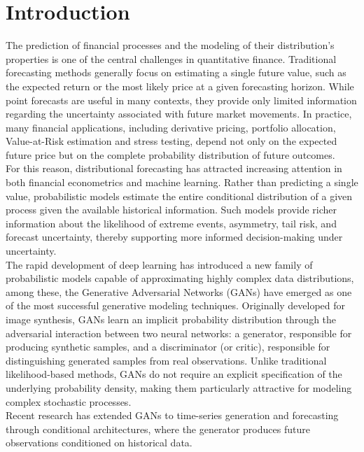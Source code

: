 \chapter{Introduction}


The prediction of financial processes and the modeling of their 
distribution's properties is
one of the central challenges in quantitative finance.
Traditional forecasting methods generally focus on estimating a single future value,
such as the expected return or the most likely price at a given forecasting horizon.
While point forecasts are useful in many contexts,
they provide only limited information regarding the uncertainty
associated with future market movements.
In practice, many financial applications, including derivative pricing, portfolio allocation, Value-at-Risk estimation and stress testing,
depend not only on the expected future price but on the complete probability distribution of future outcomes.\\

For this reason, distributional forecasting has attracted increasing attention in both financial econometrics and machine learning.
Rather than predicting a single value, 
probabilistic models estimate the entire conditional distribution of a given process given the available historical information.
Such models provide richer information about the likelihood of extreme events, asymmetry, tail risk, and forecast uncertainty,
thereby supporting more informed decision-making under uncertainty.\\

The rapid development of deep learning has introduced a new 
family of probabilistic models capable of approximating highly complex data distributions,
among these, the Generative Adversarial Networks (GANs) have emerged as one of the most successful generative modeling techniques.
Originally developed for image synthesis, GANs learn an implicit probability distribution through the adversarial interaction between two neural networks:
a generator, responsible for producing synthetic samples, and a discriminator (or critic),
responsible for distinguishing generated samples from real observations.
Unlike traditional likelihood-based methods, GANs do not require an explicit specification of the underlying probability density,
making them particularly attractive for modeling complex stochastic processes.\\


Recent research has extended GANs to time-series generation and forecasting through conditional architectures,
where the generator produces future observations conditioned on historical data.\\

